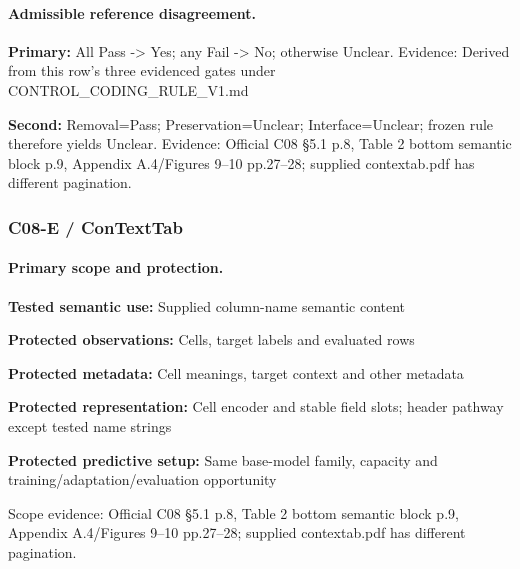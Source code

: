 \documentclass[10pt]{article}
\begin{document}
\paragraph{Admissible reference disagreement.}
\textbf{Primary:} All Pass -> Yes; any Fail -> No; otherwise Unclear. Evidence: Derived from this row’s three evidenced gates under CONTROL\_CODING\_RULE\_V1.md\par
\textbf{Second:} Removal=Pass; Preservation=Unclear; Interface=Unclear; frozen rule therefore yields Unclear. Evidence: Official C08 §5.1 p.8, Table 2 bottom semantic block p.9, Appendix A.4/Figures 9--10 pp.27--28; supplied contextab.pdf has different pagination.\par
\subsubsection*{C08-E / ConTextTab}
\paragraph{Primary scope and protection.}
\textbf{Tested semantic use:} Supplied column-name semantic content\par
\textbf{Protected observations:} Cells, target labels and evaluated rows\par
\textbf{Protected metadata:} Cell meanings, target context and other metadata\par
\textbf{Protected representation:} Cell encoder and stable field slots; header pathway except tested name strings\par
\textbf{Protected predictive setup:} Same base-model family, capacity and training/adaptation/evaluation opportunity\par
Scope evidence: Official C08 §5.1 p.8, Table 2 bottom semantic block p.9, Appendix A.4/Figures 9--10 pp.27--28; supplied contextab.pdf has different pagination.\par
\end{document}
